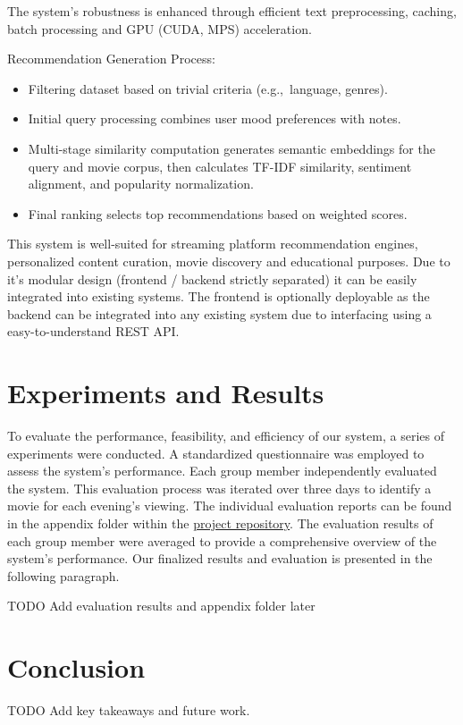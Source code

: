 \documentclass[12pt,a4paper]{article}
\begin{document}
  \noindent The system’s robustness is enhanced through efficient text preprocessing, caching, batch processing and
  GPU (CUDA, MPS) acceleration.

  \noindent Recommendation Generation Process:
  \begin{itemize}
    \item Filtering dataset based on trivial criteria (e.g.,\ language, genres).
    \item Initial query processing combines user mood preferences with notes.
    \item Multi-stage similarity computation generates semantic embeddings for the query and movie corpus, then calculates TF-IDF similarity, sentiment alignment, and popularity normalization.
    \item Final ranking selects top recommendations based on weighted scores.
  \end{itemize}

  \noindent This system is well-suited for streaming platform recommendation engines, personalized content curation, movie discovery
  and educational purposes.
  Due to it's modular design (frontend / backend strictly separated) it can be easily integrated into existing systems.
  The frontend is optionally deployable as the backend can be integrated into any existing system due to interfacing
  using a easy-to-understand REST API.


  \section{Experiments and Results}

  To evaluate the performance, feasibility, and efficiency of our system, a series of experiments were conducted.
  A standardized questionnaire was employed to assess the system’s performance.
  Each group member independently evaluated the system.
  This evaluation process was iterated over three days to identify a movie for each evening’s viewing.
  The individual evaluation reports can be found in the appendix folder within the
  \href{https://github.com/IImpaq/air-2024/appendix}{project repository}.
  The evaluation results of each group member were averaged to provide a comprehensive overview of the system’s performance.
  Our finalized results and evaluation is presented in the following paragraph.

  \noindent TODO Add evaluation results and appendix folder later

  \section{Conclusion}

  TODO Add key takeaways and future work.
\end{document}
